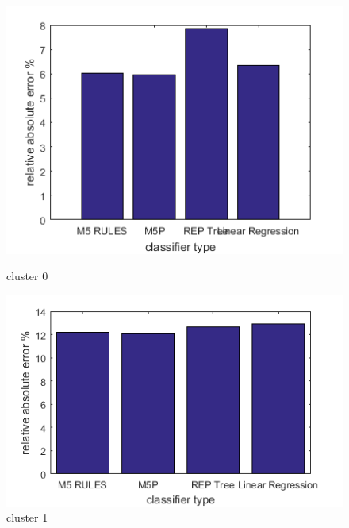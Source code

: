 \begin{figure}
\centering
\begin{minipage}{.5\textwidth}
  \centering
  \includegraphics[width=\linewidth]{cluster-0-diff-classifier-relative-abs.png}
  \caption{cluster 0}
  \label{fig:cluster-0-predictors}
\end{minipage}%
\begin{minipage}{.5\textwidth}
  \centering
  \includegraphics[width=\linewidth]{cluster-1-diff-classifier-relative-abs.png}
  \caption{cluster 1}
\label{fig:cluster-1-predictors}
\end{minipage}


\end{figure}
